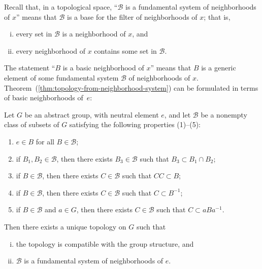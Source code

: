 Recall that, in a topological space, “$\mathscr{B}$ is a  fundamental system of neighborhoods of $x$” means that $\mathscr{B}$ is a base for the filter of neighborhoods of $x$;
that is,
\begin{enumerate}[(i)]
    \item every set in $\mathscr{B}$ is a neighborhood of $x$, and
    \item every neighborhood of $x$ contains some set in $\mathscr{B}$.
\end{enumerate}
The statement “$B$ is a basic neighborhood of $x$” means that $B$ is a generic element of some fundamental system $\mathscr{B}$ of neighborhoods of $x$.
Theorem~(\ref{thm:topology-from-neighborhood-system}) can be formulated in terms of basic neighborhoods of~$e$:

\begin{theorem}
    \label{thm:group-topology-from-identity-base}

    Let \( G \) be an abstract group, with neutral element \( e \), and let \( \mathscr{B} \) be a nonempty class of subsets of \( G \) satisfying the following properties (1)--(5):
    \begin{enumerate}
        \item \( e \in B \) for all \( B \in \mathscr{B} \);
        \item if \( B_1, B_2 \in \mathscr{B} \), then there exists \( B_3 \in \mathscr{B} \) such that \( B_3 \subset B_1 \cap B_2 \);
        \item if \( B \in \mathscr{B} \), then there exists \( C \in \mathscr{B} \) such that \( CC \subset B \);
        \item if \( B \in \mathscr{B} \), then there exists \( C \in \mathscr{B} \) such that \( C \subset B^{-1} \);
        \item if \( B \in \mathscr{B} \) and \( a \in G \), then there exists \( C \in \mathscr{B} \) such that \( C \subset aBa^{-1} \).
    \end{enumerate}
    Then there exists a unique topology on \( G \) such that
    \begin{enumerate}[(i)]
        \item the topology is compatible with the group structure, and
        \item \( \mathscr{B} \) is a fundamental system of neighborhoods of \( e \).
    \end{enumerate}
\end{theorem}

